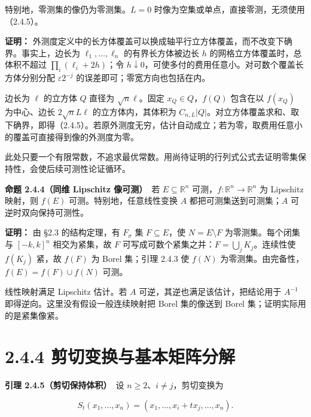 \documentclass[11pt,a4paper]{article}
\begin{document}
特别地，零测集的像仍为零测集。\(L=0\)
时像为空集或单点，直接零测，无须使用（2.4.5）。

\textbf{证明：}
外测度定义中的长方体覆盖可以换成轴平行立方体覆盖，而不改变下确界。事实上，边长为
\(\ell_1,\ldots,\ell_n\) 的有界长方体被边长 \(h\)
的网格立方体覆盖时，总体积不超过 \(\prod_i(\ell_i+2h)\)；令
\(h\downarrow0\)，可使多付的费用任意小。对可数个覆盖长方体分别分配
\(\varepsilon2^{-j}\) 的误差即可；零宽方向也包括在内。

边长为 \(\ell\) 的立方体 \(Q\) 直径为 \(\sqrt n\ell\)。固定
\(x_Q\in Q\)，\(f(Q)\) 包含在以 \(f(x_Q)\) 为中心、边长
\(2\sqrt n L\ell\) 的立方体内，其体积为
\(C_{n,L}|Q|\)。对立方体覆盖求和、取下确界，即得（2.4.5）。若原外测度无穷，估计自动成立；若为零，取费用任意小的覆盖可直接得到像的外测度为零。

此处只要一个有限常数，不追求最优常数。用尚待证明的行列式公式去证明零集保持性，会使后续可测性论证循环。

\textbf{命题 2.4.4（同维 Lipschitz 像可测）}　若
\(E\subseteq\mathbb R^n\) 可测，\(f:\mathbb R^n\to\mathbb R^n\) 为
Lipschitz 映射，则 \(f(E)\) 可测。特别地，任意线性变换 \(A\)
都把可测集送到可测集；\(A\) 可逆时双向保持可测性。

\textbf{证明：} 由 §2.3 的结构定理，有 \(F_\sigma\) 集
\(F\subseteq E\)，使 \(N=E\setminus F\) 为零测集。每个闭集与
\([-k,k]^n\) 相交为紧集，故 \(F\)
可写成可数个紧集之并：\(F=\bigcup_jK_j\)。连续性使 \(f(K_j)\) 紧，故
\(f(F)\) 为 Borel 集；引理 2.4.3 使 \(f(N)\)
为零测集。由完备性，\(f(E)=f(F)\cup f(N)\) 可测。

线性映射满足 Lipschitz 估计。若 \(A\) 可逆，其逆也满足该估计，把结论用于
\(A^{-1}\) 即得逆向。这里没有假设一般连续映射把 Borel 集的像送到 Borel
集；证明实际用的是紧集像紧。

\section[\S{}2.4.4
剪切变换与基本矩阵分解]{2.4.4
剪切变换与基本矩阵分解}\label{ux526aux5207ux53d8ux6362ux4e0eux57faux672cux77e9ux9635ux5206ux89e3}

\textbf{引理 2.4.5（剪切保持体积）}　设
\(n\ge2\)、\(i\ne j\)，剪切变换为

\begin{equation*}
S_t(x_1,\ldots,x_n)=(x_1,\ldots,x_i+t x_j,\ldots,x_n).
\tag{2.4.6}
\end{equation*}
\end{document}
